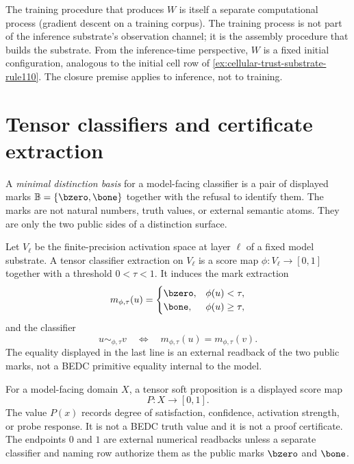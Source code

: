 \begin{remark}
\label{rem:large-model-training-vs-observation}
The training procedure that produces $W$ is itself a separate computational process (gradient descent on a training corpus). The training process is not part of the inference substrate's observation channel; it is the assembly procedure that builds the substrate. From the inference-time perspective, $W$ is a fixed initial configuration, analogous to the initial cell row of \autoref{ex:cellular-trust-substrate-rule110}. The closure premise applies to inference, not to training.
\end{remark}

\section{Tensor classifiers and certificate extraction}
\label{sec:large-model-tensor-classifier-certificate-extraction}

\begin{definition}
\label{def:large-model-minimal-distinction-marks}
A \emph{minimal distinction basis} for a model-facing classifier is a pair
of displayed marks $\mathbb{B}=\{\bzero,\bone\}$ together with the refusal
to identify them. The marks are not natural numbers, truth values, or
external semantic atoms. They are only the two public sides of a
distinction surface.
\end{definition}

\begin{definition}
\label{def:large-model-tensor-classifier-extraction}
Let $V_\ell$ be the finite-precision activation space at layer $\ell$ of
a fixed model substrate. A tensor classifier extraction on $V_\ell$ is a
score map $\phi:V_\ell\to[0,1]$ together with a threshold $0<\tau<1$.
It induces the mark extraction
$$
m_{\phi,\tau}(u)
=
\begin{cases}
\bzero, & \phi(u)<\tau,\\
\bone, & \phi(u)\ge\tau,
\end{cases}
$$
and the classifier
$$
u\sim_{\phi,\tau}v
\quad\Longleftrightarrow\quad
m_{\phi,\tau}(u)=m_{\phi,\tau}(v).
$$
The equality displayed in the last line is an external readback of the
two public marks, not a BEDC primitive equality internal to the model.
\end{definition}

\begin{definition}
\label{def:large-model-tensor-soft-proposition}
For a model-facing domain $X$, a tensor soft proposition is a displayed
score map
$$
P:X\to[0,1].
$$
The value $P(x)$ records degree of satisfaction, confidence, activation
strength, or probe response. It is not a BEDC truth value and it is not a
proof certificate. The endpoints $0$ and $1$ are external numerical
readbacks unless a separate classifier and naming row authorize them as
the public marks $\bzero$ and $\bone$.
\end{definition}

